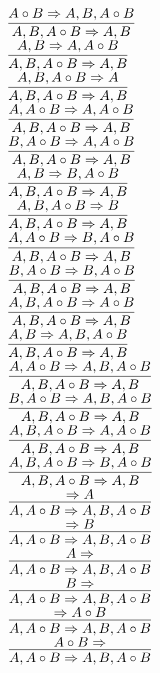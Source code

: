 \documentclass[11pt]{article}
\begin{document}
\begin{center}
\bigskip
\\$\infer{A, B, A\circ B\Rightarrow A, B}{A\circ B\Rightarrow A, B, A\circ B}$
\bigskip
\\$\infer{A, B, A\circ B\Rightarrow A, B}{A, B\Rightarrow A, A\circ B}$
\bigskip
\\$\infer{A, B, A\circ B\Rightarrow A, B}{A, B, A\circ B\Rightarrow A}$
\bigskip
\\$\infer{A, B, A\circ B\Rightarrow A, B}{A, A\circ B\Rightarrow A, A\circ B}$
\bigskip
\\$\infer{A, B, A\circ B\Rightarrow A, B}{B, A\circ B\Rightarrow A, A\circ B}$
\bigskip
\\$\infer{A, B, A\circ B\Rightarrow A, B}{A, B\Rightarrow B, A\circ B}$
\bigskip
\\$\infer{A, B, A\circ B\Rightarrow A, B}{A, B, A\circ B\Rightarrow B}$
\bigskip
\\$\infer{A, B, A\circ B\Rightarrow A, B}{A, A\circ B\Rightarrow B, A\circ B}$
\bigskip
\\$\infer{A, B, A\circ B\Rightarrow A, B}{B, A\circ B\Rightarrow B, A\circ B}$
\bigskip
\\$\infer{A, B, A\circ B\Rightarrow A, B}{A, B, A\circ B\Rightarrow A\circ B}$
\bigskip
\\$\infer{A, B, A\circ B\Rightarrow A, B}{A, B\Rightarrow A, B, A\circ B}$
\bigskip
\\$\infer{A, B, A\circ B\Rightarrow A, B}{A, A\circ B\Rightarrow A, B, A\circ B}$
\bigskip
\\$\infer{A, B, A\circ B\Rightarrow A, B}{B, A\circ B\Rightarrow A, B, A\circ B}$
\bigskip
\\$\infer{A, B, A\circ B\Rightarrow A, B}{A, B, A\circ B\Rightarrow A, A\circ B}$
\bigskip
\\$\infer{A, B, A\circ B\Rightarrow A, B}{A, B, A\circ B\Rightarrow B, A\circ B}$
\bigskip
\\$\infer{A, A\circ B\Rightarrow A, B, A\circ B}{\Rightarrow A}$
\bigskip
\\$\infer{A, A\circ B\Rightarrow A, B, A\circ B}{\Rightarrow B}$
\bigskip
\\$\infer{A, A\circ B\Rightarrow A, B, A\circ B}{A\Rightarrow }$
\bigskip
\\$\infer{A, A\circ B\Rightarrow A, B, A\circ B}{B\Rightarrow }$
\bigskip
\\$\infer{A, A\circ B\Rightarrow A, B, A\circ B}{\Rightarrow A\circ B}$
\bigskip
\\$\infer{A, A\circ B\Rightarrow A, B, A\circ B}{A\circ B\Rightarrow }$
\bigskip

\end{center}
\end{document}
